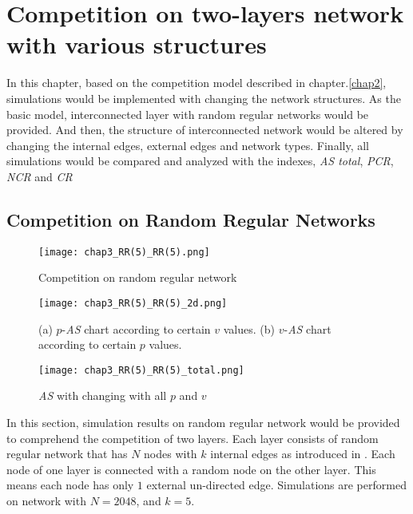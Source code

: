 

\chapter{Competition on two-layers network with various structures}
\label{chap3}
In this chapter, based on the competition model described in chapter.\ref{chap2}, simulations would be implemented with changing the network structures. As the basic model, interconnected layer with random regular networks would be provided. And then, the structure of interconnected network  would be altered by changing the internal edges, external edges and network types. Finally, all simulations would be compared and analyzed with the indexes, \textit{AS total}, \textit{PCR}, \textit{NCR} and \textit{CR}

\section{Competition on Random Regular Networks}
\label{competition on Random Regular Networks}
\begin{figure}[!h]
	\centering
	\texttt{[image: chap3\_RR(5)\_RR(5).png]}
	\caption{Competition on random regular network}
	\label{chap3_RR(5)_RR(5)}
\end{figure}
\begin{figure}[!h]
	\centering
	\texttt{[image: chap3\_RR(5)\_RR(5)\_2d.png]}
	\caption{(a) $p$-\textit{AS} chart according to certain $v$ values. (b) $v$-\textit{AS} chart according to certain $p$ values.}
	\label{chap3_RR(5)_RR(5)_2d}
\end{figure}
\begin{figure}[!h]
	\centering
	\texttt{[image: chap3\_RR(5)\_RR(5)\_total.png]}
	\caption{\textit{AS} with changing with all $p$ and $v$}
	\label{chap3_RR(5)_RR(5)_total}
\end{figure}
In this section, simulation results on random regular network would be provided to comprehend the competition of two layers. Each layer consists of random regular network that has $N$ nodes with $k$ internal edges as introduced in \parencite{kimsangwoo2012, choi2011, bela2001}. Each node of one layer is connected with a random node on the other layer. This means each node has only $1$ external un-directed edge. Simulations are performed on network with $N=2048$, and $k = 5$. 

